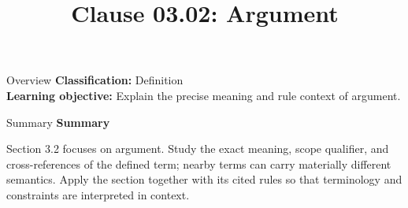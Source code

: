 \documentclass[10pt,letterpaper]{article}
\title{Clause 03.02: Argument}
\author{}
\date{}
\begin{document}
\maketitle
\begin{CornellOverviewBox}{Overview}
\textbf{Classification:} Definition\\[2pt]
\textbf{Learning objective:} Explain the precise meaning and rule context of argument.
\end{CornellOverviewBox}\begin{CornellSummaryBox}{Summary}
{\sffamily\bfseries\color{Accent} Summary}\par\vspace{3pt}Section 3.2 focuses on argument. Study the exact meaning, scope qualifier, and cross-references of the defined term; nearby terms can carry materially different semantics. Apply the section together with its cited rules so that terminology and constraints are interpreted in context.
\end{CornellSummaryBox}
\end{document}
